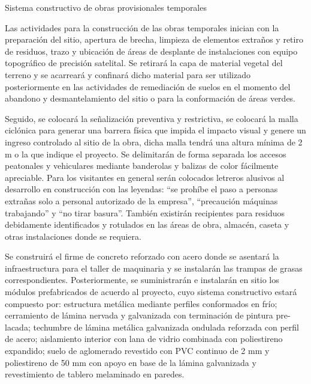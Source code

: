 \documentclass{article}
\begin{document}
\bigskip


\bigskip

Sistema constructivo de obras provisionales temporales


\bigskip

Las actividades para la construcción de las obras temporales inician con la preparación del sitio, apertura de brecha, limpieza de elementos extraños y retiro de residuos, trazo y ubicación de áreas de desplante de instalaciones con equipo topográfico de precisión satelital. Se retirará la capa de material vegetal del terreno y se acarreará y confinará dicho material para ser utilizado posteriormente en las actividades de remediación de suelos en el momento del abandono y desmantelamiento del sitio o para la conformación de áreas verdes. 


\bigskip

Seguido, se colocará la señalización preventiva y restrictiva, se colocará la malla ciclónica para generar una barrera física que impida el impacto visual y genere un ingreso controlado al sitio de la obra, dicha malla tendrá una altura mínima de 2 m o la que indique el proyecto. Se delimitarán de forma separada los accesos peatonales y vehiculares mediante banderolas y balizas de color fácilmente apreciable. Para los visitantes en general serán colocados letreros alusivos al desarrollo en construcción con las leyendas: “se prohíbe el paso a personas extrañas solo a personal autorizado de la empresa”, “precaución máquinas trabajando” y “no tirar basura”. También existirán recipientes para residuos debidamente identificados y rotulados en las áreas de obra, almacén, caseta y otras instalaciones donde se requiera.


\bigskip

Se construirá el firme de concreto reforzado con acero donde se asentará la infraestructura para el taller de maquinaria y se instalarán las trampas de grasas correspondientes. Posteriormente, se suministrarán e instalarán en sitio los módulos prefabricados de acuerdo al proyecto, cuyo sistema constructivo estará compuesto por: estructura metálica mediante perfiles conformados en frío; cerramiento de lámina nervada y galvanizada con terminación de pintura pre-lacada; techumbre de lámina metálica galvanizada ondulada reforzada con perfil de acero; aislamiento interior con lana de vidrio combinada con poliestireno expandido; suelo de aglomerado revestido con PVC continuo de 2 mm y poliestireno de 50 mm con apoyo en base de la lámina galvanizada y revestimiento de tablero melaminado en paredes.
\end{document}
